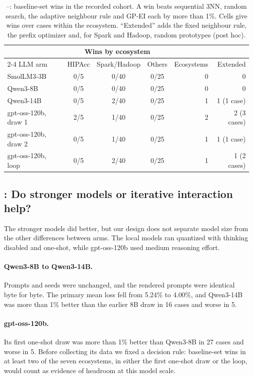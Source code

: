 \begin{table}[t]
\centering
\caption{--: baseline-set wins in the recorded cohort. A win beats sequential 3NN, random search, the adaptive neighbour rule and GP-EI each by more than 1\%. Cells give wins over cases within the ecosystem. ``Extended'' adds the fixed neighbour rule, the prefix optimizer and, for Spark and Hadoop, random prototypes (post hoc).}
\label{tab:rq2}
\small
\begin{tabular}{lcccrr}
\toprule
 & \multicolumn{3}{c}{Wins by ecosystem} & & \\
\cmidrule(lr){2-4}
LLM arm & HIPAcc & Spark/Hadoop & Others & Ecosystems & Extended \\
\midrule
SmolLM3-3B & 0/5 & 0/40 & 0/25 & 0 & 0 \\
Qwen3-8B & 0/5 & 0/40 & 0/25 & 0 & 0 \\
Qwen3-14B & 0/5 & 2/40 & 0/25 & 1 & 1 (1 case) \\
gpt-oss-120b, draw 1 & 2/5 & 1/40 & 0/25 & 2 & 2 (3 cases) \\
gpt-oss-120b, draw 2 & 0/5 & 1/40 & 0/25 & 1 & 1 (1 case) \\
gpt-oss-120b, loop & 0/5 & 2/40 & 0/25 & 1 & 1 (2 cases) \\
\bottomrule
\end{tabular}
\end{table}

\subsection{: Do stronger models or iterative interaction help?}
\label{sec:rq3}

The stronger models did better, but our design does not separate model size from the other differences between arms. The local models ran quantized with thinking disabled and one-shot, while gpt-oss-120b used medium reasoning effort.

\paragraph{Qwen3-8B to Qwen3-14B.} Prompts and seeds were unchanged, and the rendered prompts were identical byte for byte. The primary mean loss fell from 5.24\% to 4.00\%, and Qwen3-14B was more than 1\% better than the earlier 8B draw in 16 cases and worse in 5.

\paragraph{gpt-oss-120b.} Its first one-shot draw was more than 1\% better than Qwen3-8B in 27 cases and worse in 5. Before collecting its data we fixed a decision rule: baseline-set wins in at least two of the seven ecosystems, in either the first one-shot draw or the loop, would count as evidence of headroom at this model scale.

